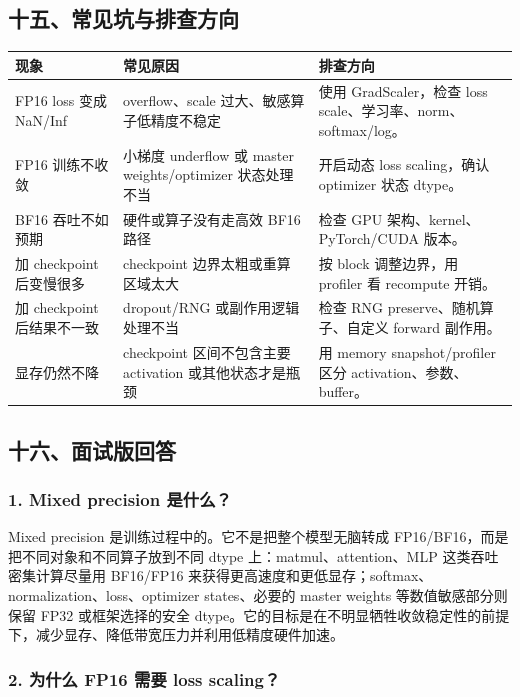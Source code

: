 \subsection{十五、常见坑与排查方向}

\begin{center}
{\small
\begin{tabular}{p{3.9cm}p{4.7cm}p{4.2cm}}
\hline
\textbf{现象} & \textbf{常见原因} & \textbf{排查方向} \\
\hline
FP16 loss 变成 NaN/Inf & overflow、scale 过大、敏感算子低精度不稳定 & 使用 GradScaler，检查 loss scale、学习率、norm、softmax/log。 \\
FP16 训练不收敛 & 小梯度 underflow 或 master weights/optimizer 状态处理不当 & 开启动态 loss scaling，确认 optimizer 状态 dtype。 \\
BF16 吞吐不如预期 & 硬件或算子没有走高效 BF16 路径 & 检查 GPU 架构、kernel、PyTorch/CUDA 版本。 \\
加 checkpoint 后变慢很多 & checkpoint 边界太粗或重算区域太大 & 按 block 调整边界，用 profiler 看 recompute 开销。 \\
加 checkpoint 后结果不一致 & dropout/RNG 或副作用逻辑处理不当 & 检查 RNG preserve、随机算子、自定义 forward 副作用。 \\
显存仍然不降 & checkpoint 区间不包含主要 activation 或其他状态才是瓶颈 & 用 memory snapshot/profiler 区分 activation、参数、buffer。 \\
\hline
\end{tabular}
}
\end{center}

\subsection{十六、面试版回答}

\subsubsection*{1. Mixed precision 是什么？}

Mixed precision 是训练过程中的。它不是把整个模型无脑转成 FP16/BF16，而是把不同对象和不同算子放到不同 dtype 上：matmul、attention、MLP 这类吞吐密集计算尽量用 BF16/FP16 来获得更高速度和更低显存；softmax、normalization、loss、optimizer states、必要的 master weights 等数值敏感部分则保留 FP32 或框架选择的安全 dtype。它的目标是在不明显牺牲收敛稳定性的前提下，减少显存、降低带宽压力并利用低精度硬件加速。

\subsubsection*{2. 为什么 FP16 需要 loss scaling？}

